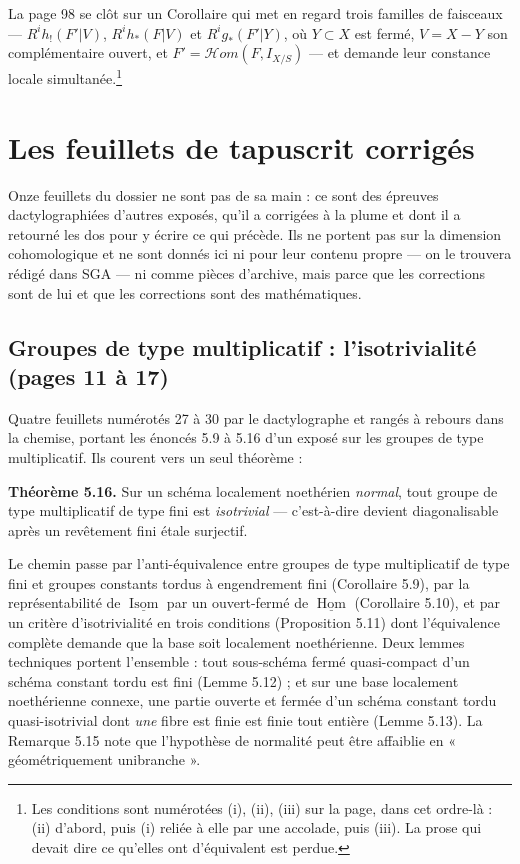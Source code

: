 \documentclass[11pt,a4paper]{article}
\begin{document}
La page 98 se clôt sur un Corollaire qui met en regard trois familles de
faisceaux — $R^i h_{!}(F'|V)$, $R^i h_{*}(F|V)$ et $R^i g_{*}(F'|Y)$, où
$Y \subset X$ est fermé, $V = X - Y$ son complémentaire ouvert, et
$F' = \mathcal{H}om(F, I_{X/S})$ — et demande leur constance locale
simultanée.\footnote{Les conditions sont numérotées (i), (ii), (iii) sur la
page, dans cet ordre-là : (ii) d'abord, puis (i) reliée à elle par une
accolade, puis (iii). La prose qui devait dire ce qu'elles ont d'équivalent est
perdue.}

\section*{Les feuillets de tapuscrit corrigés}

Onze feuillets du dossier ne sont pas de sa main : ce sont des épreuves
dactylographiées d'autres exposés, qu'il a corrigées à la plume et dont il a
retourné les dos pour y écrire ce qui précède. Ils ne portent pas sur la
dimension cohomologique et ne sont donnés ici ni pour leur contenu propre — on
le trouvera rédigé dans SGA — ni comme pièces d'archive, mais parce que les
corrections sont de lui et que les corrections sont des mathématiques.

\subsection*{Groupes de type multiplicatif : l'isotrivialité (pages 11 à 17)}

Quatre feuillets numérotés 27 à 30 par le dactylographe et rangés à rebours dans
la chemise, portant les énoncés 5.9 à 5.16 d'un exposé sur les groupes de type
multiplicatif. Ils courent vers un seul théorème :

\textbf{Théorème 5.16.} Sur un schéma localement noethérien \emph{normal}, tout
groupe de type multiplicatif de type fini est \emph{isotrivial} — c'est-à-dire
devient diagonalisable après un revêtement fini étale surjectif.

Le chemin passe par l'anti-équivalence entre groupes de type multiplicatif de
type fini et groupes constants tordus à engendrement fini (Corollaire 5.9), par
la représentabilité de $\underline{\operatorname{Isom}}$ par un ouvert-fermé de
$\underline{\operatorname{Hom}}$ (Corollaire 5.10), et par un critère
d'isotrivialité en trois conditions (Proposition 5.11) dont l'équivalence
complète demande que la base soit localement noethérienne. Deux lemmes
techniques portent l'ensemble : tout sous-schéma fermé quasi-compact d'un
schéma constant tordu est fini (Lemme 5.12) ; et sur une base localement
noethérienne connexe, une partie ouverte et fermée d'un schéma constant tordu
quasi-isotrivial dont \emph{une} fibre est finie est finie tout entière (Lemme
5.13). La Remarque 5.15 note que l'hypothèse de normalité peut être affaiblie
en « géométriquement unibranche ».
\end{document}
